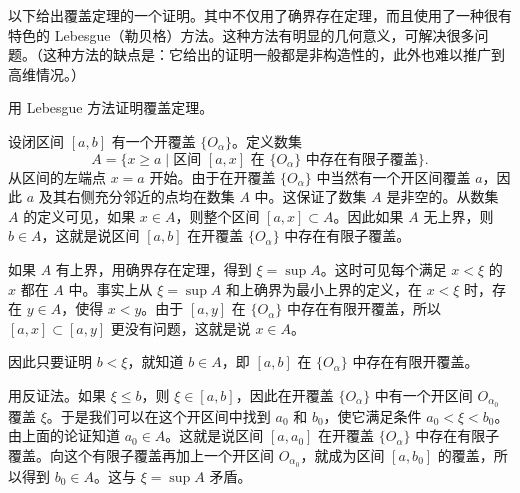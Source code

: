 以下给出覆盖定理的一个证明。其中不仅用了确界存在定理，而且使用了一种很有特色的 Lebesgue（勒贝格）方法。这种方法有明显的几何意义，可解决很多问题。（这种方法的缺点是：它给出的证明一般都是非构造性的，此外也难以推广到高维情况。）

\begin{xexample}[3.5.2]
用 Lebesgue 方法证明覆盖定理。
\end{xexample}
\begin{xproof}
设闭区间 $[a,b]$ 有一个开覆盖 $\{O_{\alpha}\}$。定义数集
\[
  A=\{x\geqslant a\mid \text{区间 }[a,x]\text{ 在 }\{O_{\alpha}\}\text{ 中存在有限子覆盖}\}.
\]
从区间的左端点 $x=a$ 开始。由于在开覆盖 $\{O_{\alpha}\}$ 中当然有一个开区间覆盖 $a$，因此 $a$ 及其右侧充分邻近的点均在数集 $A$ 中。这保证了数集 $A$ 是非空的。从数集 $A$ 的定义可见，如果 $x\in A$，则整个区间 $[a,x]\subset A$。因此如果 $A$ 无上界，则 $b\in A$，这就是说区间 $[a,b]$ 在开覆盖 $\{O_{\alpha}\}$ 中存在有限子覆盖。

如果 $A$ 有上界，用确界存在定理，得到 $\xi=\sup A$。这时可见每个满足 $x<\xi$ 的 $x$ 都在 $A$ 中。事实上从 $\xi=\sup A$ 和上确界为最小上界的定义，在 $x<\xi$ 时，存在 $y\in A$，使得 $x<y$。由于 $[a,y]$ 在 $\{O_{\alpha}\}$ 中存在有限开覆盖，所以 $[a,x]\subset[a,y]$ 更没有问题，这就是说 $x\in A$。

因此只要证明 $b<\xi$，就知道 $b\in A$，即 $[a,b]$ 在 $\{O_{\alpha}\}$ 中存在有限开覆盖。

用反证法。如果 $\xi\leqslant b$，则 $\xi\in[a,b]$，因此在开覆盖 $\{O_{\alpha}\}$ 中有一个开区间 $O_{\alpha_0}$ 覆盖 $\xi$。于是我们可以在这个开区间中找到 $a_0$ 和 $b_0$，使它满足条件 $a_0<\xi<b_0$。由上面的论证知道 $a_0\in A$。这就是说区间 $[a,a_0]$ 在开覆盖 $\{O_{\alpha}\}$ 中存在有限子覆盖。向这个有限子覆盖再加上一个开区间 $O_{\alpha_0}$，就成为区间 $[a,b_0]$ 的覆盖，所以得到 $b_0\in A$。这与 $\xi=\sup A$ 矛盾。
\end{xproof}

